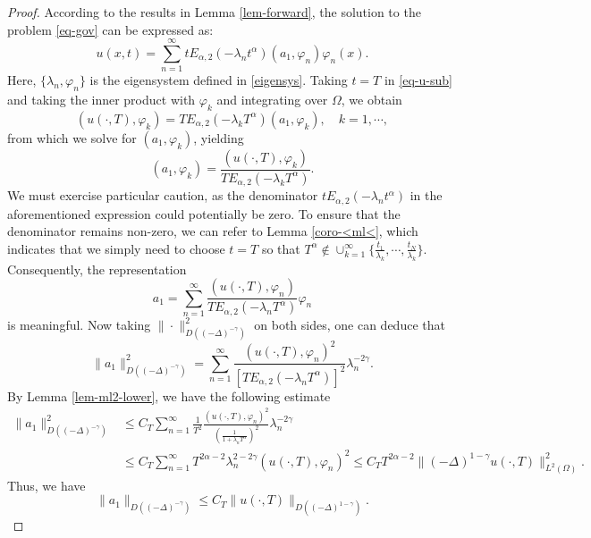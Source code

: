 \documentclass[11pt]{article}
\numberwithin{equation}{section}
\begin{document}
\begin{proof}
According to the results in Lemma \ref{lem-forward}, the solution to the problem \eqref{eq-gov} can be expressed as:
\begin{equation}\label{eq-u-sub}
  u(x,t) = \sum_{n=1}^{\infty} t E_{\alpha,2}(-\lambda_n t^\alpha)(a_1, \varphi_n) \varphi_n(x).
\end{equation}
Here, $\{\lambda_n,\varphi_n\}$ is the eigensystem defined in \eqref{eigensys}. Taking $t=T$ in \eqref{eq-u-sub} and taking the inner product with $\varphi_k$ and integrating over $\Omega$, we obtain
\[
(u(\cdot, T), \varphi_k) = TE_{\alpha, 2} (-\lambda_k T^{\alpha}) (a_1, \varphi_k),\quad k=1,\cdots,
\]
from which we solve for $(a_1, \varphi_k)$, yielding
\begin{equation}\label{eq-a1_fourier}
(a_1, \varphi_k) = \frac{(u(\cdot, T), \varphi_k)}{TE_{\alpha, 2}(-\lambda_k T^{\alpha})}.
\end{equation}
We must exercise particular caution, as the denominator $tE_{\alpha,2}(-\lambda_n t^\alpha)$ in the aforementioned expression could potentially be zero. To ensure that the denominator remains non-zero, we can refer to Lemma \ref{coro-<ml<}, which indicates that we simply need to choose $t=T$ so that $T^\alpha \not\in \cup_{k=1}^\infty \{ \frac{t_1}{\lambda_k}, \cdots, \frac{t_N}{\lambda_k}\}$. Consequently, the representation
\[
a_1 = \sum_{n=1}^{\infty} \frac{(u(\cdot,T), \varphi_n)}{T E_{\alpha, 2}(-\lambda_n T^\alpha)} \varphi_n
\]
is meaningful. Now taking $ \| \cdot \|_{D((-\Delta)^{-\gamma})}^{2} $ on both sides, one can deduce that
\[
\|a_1\|_{D((-\Delta)^{-\gamma})}^2 = \sum_{n=1}^{\infty} \frac{(u(\cdot,T), \varphi_n)^2}{[T E_{\alpha, 2}(-\lambda_n T^\alpha)]^2} \lambda_n^{-2\gamma}.
\]
By Lemma \ref{lem-ml2-lower}, we have the following estimate
\begin{align*}
 \|a_1\|_{D((-\Delta)^{-\gamma})}^2 & \leq C_T \sum_{n=1}^{\infty} \frac{1}{T^2} \frac{(u(\cdot,T), \varphi_n)^2}{(\frac{1}{1 + \lambda_n T^\alpha})^2} \lambda_n^{-2\gamma} \\
  & \leq C_T \sum_{n=1}^{\infty} T^{2\alpha - 2} \lambda_n^{2-2\gamma} (u(\cdot,T), \varphi_n)^2
\leq C_T T^{2 \alpha - 2} \|(-\Delta)^{1-\gamma} u(\cdot,T)\|_{L^2(\Omega)}^2.
\end{align*}
Thus, we have
\[
\|a_1\|_{D((-\Delta)^{-\gamma})} \leq C_T \|u(\cdot,T)\|_{D((-\Delta)^{1-\gamma})}.
\]


\end{proof}
\end{document}
